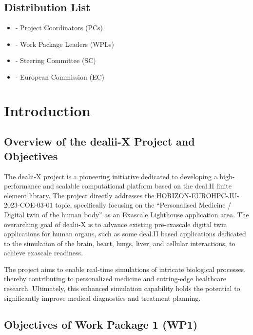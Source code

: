\documentclass[a4paper,12pt]{article}
\begin{document}
\subsection*{{Distribution List}}
\begin{itemize}
    \item [] - Project Coordinators (PCs)
    \item [] - Work Package Leaders (WPLs)
    \item [] - Steering Committee (SC)
    \item [] - European Commission (EC)
\end{itemize}

\vspace*{2cm}

\disclaimer

\newpage

\tableofcontents %

\newpage

\section{Introduction}
    \subsection{Overview of the dealii-X Project and Objectives}

The dealii-X project is a pioneering initiative dedicated to developing a
high-performance and scalable computational platform based on the deal.II finite
element library. The project directly addresses the
HORIZON-EUROHPC-JU-2023-COE-03-01 topic, specifically focusing on the
``Personalised Medicine / Digital twin of the human body'' as an Exascale
Lighthouse application area. The overarching goal of dealii-X is to advance
existing pre-exascale digital twin applications for human organs, such as some
deal.II based applications dedicated to the simulation of the brain, heart,
lungs, liver, and cellular interactions, to achieve exascale readiness. 

The project aims to enable real-time simulations of intricate biological
processes, thereby contributing to personalized medicine and cutting-edge
healthcare research. Ultimately, this enhanced simulation capability holds the
potential to significantly improve medical diagnostics and treatment planning.

\subsection{Objectives of Work Package 1 (WP1)}
\end{document}
